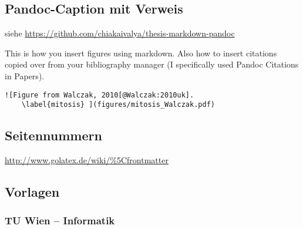 \hypertarget{pandoc-caption-mit-verweis}{%
\subsection{Pandoc-Caption mit
Verweis}\label{pandoc-caption-mit-verweis}}

siehe \url{https://github.com/chiakaivalya/thesis-markdown-pandoc}

This is how you insert figures using markdown. Also how to insert
citations copied over from your bibliography manager (I specifically
used Pandoc Citations in Papers).

\begin{verbatim}
![Figure from Walczak, 2010[@Walczak:2010uk]. 
    \label{mitosis} ](figures/mitosis_Walczak.pdf)
\end{verbatim}

\hypertarget{seitennummern}{%
\subsection{Seitennummern}\label{seitennummern}}

\url{http://www.golatex.de/wiki/\%5Cfrontmatter}

\begin{Shaded}
\end{Shaded}

\hypertarget{vorlagen}{%
\subsection{Vorlagen}\label{vorlagen}}

\hypertarget{tu-wien-informatik}{%
\subsubsection{TU Wien -- Informatik}\label{tu-wien-informatik}}

